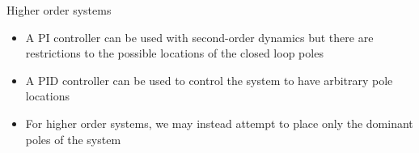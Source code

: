 \documentclass[10pt]{beamer-control}
\begin{document}
\begin{frame}{Higher order systems}
  \begin{itemize}
    \item A PI controller can be used with second-order dynamics but there are restrictions to the possible locations of the closed loop poles
    \item A PID controller can be used to control the system to have arbitrary pole locations
    \item For higher order systems, we may instead attempt to place only the dominant poles of the system
  \end{itemize}
\end{frame}


\SUMMARYFRAME
\FINALE
\end{document}
